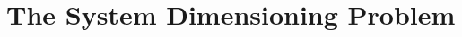 \documentclass[a4paper,11pt,twoside,openright,notitlepage,draft]{report}
\begin{document}
%
%
\renewcommand*\contentsname{Table of contents}
\dominitoc
\tableofcontents
\cleardoublepage
{}
\setcounter{page}{1}
%
%
\part{The System Dimensioning Problem}

%
%
%
%
%
%
%
%
%
%
\end{document}

